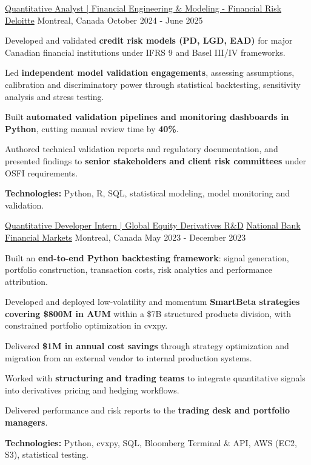 \begin{cventries}
  \cventry
    {\href{https://www.deloitte.com/ca/en.html}{Quantitative Analyst | Financial Engineering \& Modeling - Financial Risk}}
    {\href{https://www.deloitte.com/ca/en.html}{Deloitte}}
    {Montreal, Canada}
    {October 2024 - June 2025}
    {
      \begin{cvitems}
        \item{Developed and validated \textbf{credit risk models (PD, LGD, EAD)} for major Canadian financial institutions under IFRS 9 and Basel III/IV frameworks.}
        \item{Led \textbf{independent model validation engagements}, assessing assumptions, calibration and discriminatory power through statistical backtesting, sensitivity analysis and stress testing.}
        \item{Built \textbf{automated validation pipelines and monitoring dashboards in Python}, cutting manual review time by \textbf{40\%}.}
        \item{Authored technical validation reports and regulatory documentation, and presented findings to \textbf{senior stakeholders and client risk committees} under OSFI requirements.}
        \item{\textbf{Technologies:} Python, R, SQL, statistical modeling, model monitoring and validation.}
      \end{cvitems}
    }

  \cventry
    {\href{https://www.nbc.ca/en/capitalmarkets.html}{Quantitative Developer Intern | Global Equity Derivatives R\&D}}
    {\href{https://www.nbc.ca/en/capitalmarkets.html}{National Bank Financial Markets}}
    {Montreal, Canada}
    {May 2023 - December 2023}
    {
      \begin{cvitems}
        \item{Built an \textbf{end-to-end Python backtesting framework}: signal generation, portfolio construction, transaction costs, risk analytics and performance attribution.}
        \item{Developed and deployed low-volatility and momentum \textbf{SmartBeta strategies covering \$800M in AUM} within a \$7B structured products division, with constrained portfolio optimization in cvxpy.}
        \item{Delivered \textbf{\$1M in annual cost savings} through strategy optimization and migration from an external vendor to internal production systems.}
        \item{Worked with \textbf{structuring and trading teams} to integrate quantitative signals into derivatives pricing and hedging workflows.}
        \item{Delivered performance and risk reports to the \textbf{trading desk and portfolio managers}.}
        \item{\textbf{Technologies:} Python, cvxpy, SQL, Bloomberg Terminal \& API, AWS (EC2, S3), statistical testing.}
      \end{cvitems}
    }


\end{cventries}
